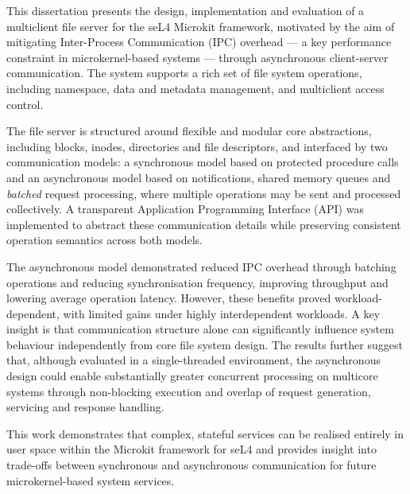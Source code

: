 This dissertation presents the design, implementation and evaluation of a multiclient file server for the seL4 Microkit framework, motivated by the aim of mitigating Inter-Process Communication (IPC) overhead — a key performance constraint in microkernel-based systems — through asynchronous client-server communication. The system supports a rich set of file system operations, including namespace, data and metadata management, and multiclient access control.

The file server is structured around flexible and modular core abstractions, including blocks, inodes, directories and file descriptors, and interfaced by two communication models: a synchronous model based on protected procedure calls and an asynchronous model based on notifications, shared memory queues and \textit{batched} request processing, where multiple operations may be sent and processed collectively. A transparent Application Programming Interface (API) was implemented to abstract these communication details while preserving consistent operation semantics across both models.

The asynchronous model demonstrated reduced IPC overhead through batching operations and reducing synchronisation frequency, improving throughput and lowering average operation latency. However, these benefits proved workload-dependent, with limited gains under highly interdependent workloads. A key insight is that communication structure alone can significantly influence system behaviour independently from core file system design. The results further suggest that, although evaluated in a single-threaded environment, the asynchronous design could enable substantially greater concurrent processing on multicore systems through non-blocking execution and overlap of request generation, servicing and response handling.

This work demonstrates that complex, stateful services can be realised entirely in user space within the Microkit framework for seL4 and provides insight into trade-offs between synchronous and asynchronous communication for future microkernel-based system services.
